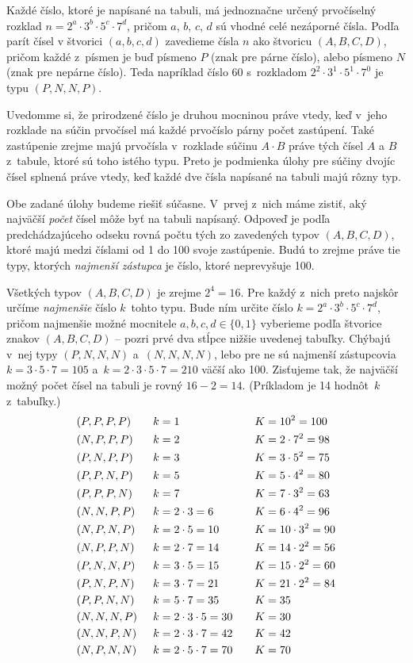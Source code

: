 {%
Každé číslo, ktoré je napísané na tabuli, má
jednoznačne určený prvočíselný rozklad
$n=2^a\cdot3^b\cdot5^c\cdot7^d$, pričom $a$, $b$, $c$, $d$
sú vhodné celé nezáporné čísla. Podľa parít čísel v štvorici
$(a,b,c,d)$ zavedieme  čísla $n$ ako štvoricu $(A,B,C,D)$, pričom každé
z~písmen je buď písmeno $P$ (znak pre párne číslo), alebo písmeno $N$
(znak pre nepárne číslo).
Teda napríklad číslo 60 s~rozkladom $2^2\cdot3^1\cdot5^1\cdot7^0$ je typu
$(P,N,N,P)$.

Uvedomme si, že prirodzené číslo je druhou mocninou práve vtedy, keď
v~jeho rozklade na súčin prvočísel má každé prvočíslo párny počet zastúpení.
Také zastúpenie zrejme majú prvočísla v~rozklade súčinu $A\cdot B$
práve tých čísel $A$ a $B$ z~tabule, ktoré sú toho istého typu.
Preto je podmienka úlohy pre súčiny dvojíc čísel splnená
práve vtedy, keď každé dve čísla napísané na tabuli majú rôzny typ.

Obe zadané úlohy budeme riešiť súčasne. V~prvej z~nich máme
zistiť, aký najväčší {\it počet\/} čísel môže byť na tabuli napísaný.
Odpoveď je podľa predchádzajúceho odseku rovná počtu tých zo
zavedených typov $(A,B,C,D)$, ktoré majú medzi číslami od 1 do 100
svoje zastúpenie. Budú to zrejme práve tie typy, ktorých
{\it najmenší zástupca\/} je číslo, ktoré neprevyšuje 100.

Všetkých typov $(A,B,C,D)$ je zrejme $2^4=16$.
Pre každý z~nich preto najskôr určíme {\it najmenšie\/}
číslo $k$~tohto typu. Bude ním určite číslo
$k=2^a\cdot3^b\cdot5^c\cdot7^d$, pričom najmenšie možné
mocnitele $a,b,c,d\in\{0,1\}$ vyberieme podľa štvorice znakov
$(A,B,C,D)$ -- pozri prvé dva stĺpce nižšie uvedenej tabuľky.
Chýbajú v~nej typy $(P,N,N,N)$ a~$(N,N,N,N)$, lebo pre ne sú
najmenší zástupcovia $k=3\cdot5\cdot7=105$ a~$k=2\cdot3\cdot5\cdot7=210$ väčší ako 100. Zisťujeme tak, že
najväčší možný počet čísel na tabuli je rovný $16-2=14$.
(Príkladom je 14 hodnôt~$k$ z~tabuľky.)
$$
\alignedat3
&(P,P,P,P) \qquad& k&=1 & K&=10^2=100 \\
&(N,P,P,P) & k&=2 & K&=2\cdot 7^2=98 \\
&(P,N,P,P) & k&=3 & K&=3\cdot5^2=75 \\
&(P,P,N,P) & k&=5 & K&=5\cdot4^2=80 \\
&(P,P,P,N) & k&=7 & K&=7\cdot3^2=63 \\
&(N,N,P,P) & k&=2\cdot 3=6 & K&=6\cdot4^2=96 \\
&(N,P,N,P) & k&=2\cdot 5=10 & K&=10\cdot3^2=90 \\
&(N,P,P,N) & k&=2\cdot 7=14 & K&=14\cdot2^2=56 \\
&(P,N,N,P) & k&=3\cdot 5=15 & K&=15\cdot2^2=60 \\
&(P,N,P,N) & k&=3\cdot 7=21 & K&=21\cdot2^2=84 \\
&(P,P,N,N) & k&=5\cdot 7=35 & K&=35 \\
&(N,N,N,P) & k&=2\cdot 3\cdot 5=30 & K&=30 \\
&(N,N,P,N) & k&=2\cdot 3\cdot 7=42 & K&=42 \\
&(N,P,N,N) & k&=2\cdot 5\cdot 7=70\qquad & K&=70 \\
\endalignedat
$$

}

